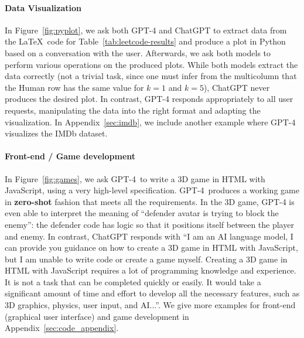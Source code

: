 \paragraph{Data Visualization} In Figure~\ref{fig:pyplot}, we ask both GPT-4 and ChatGPT to extract data from the \LaTeX\ code for Table~\ref{tab:leetcode-results} and produce a plot in Python based on a conversation with the user. Afterwards, we ask both models to perform various operations on the produced plots. While both models extract the data correctly (not a trivial task, since one must infer from the multicolumn that the Human row has the same value for $k=1$ and $k=5$), ChatGPT never produces the desired plot. In contrast, GPT-4 responds appropriately to all user requests, manipulating the data into the right format and adapting the visualization. In Appendix~\ref{sec:imdb}, we include another example where GPT-4 visualizes the IMDb dataset.

\paragraph{Front-end / Game development} In Figure~\ref{fig:games}, we ask GPT-4\ to write a 3D game in HTML with JavaScript, using a very high-level specification. GPT-4\ produces a working game in \textbf{zero-shot} fashion that meets all the requirements. In the 3D game, GPT-4 is even able to interpret the meaning of ``defender avatar is trying to block the enemy'': the defender code has logic so that it positions itself between the player and enemy. In contrast, ChatGPT responds with ``I am an AI language model, I can provide you guidance on how to create a 3D game in HTML with JavaScript, but I am unable to write code or create a game myself. Creating a 3D game in HTML with JavaScript requires a lot of programming knowledge and experience. It is not a task that can be completed quickly or easily. It would take a significant amount of time and effort to develop all the necessary features, such as 3D graphics, physics, user input, and AI...''. We give more examples for front-end (graphical user interface) and game development in Appendix~\ref{sec:code_appendix}. 

